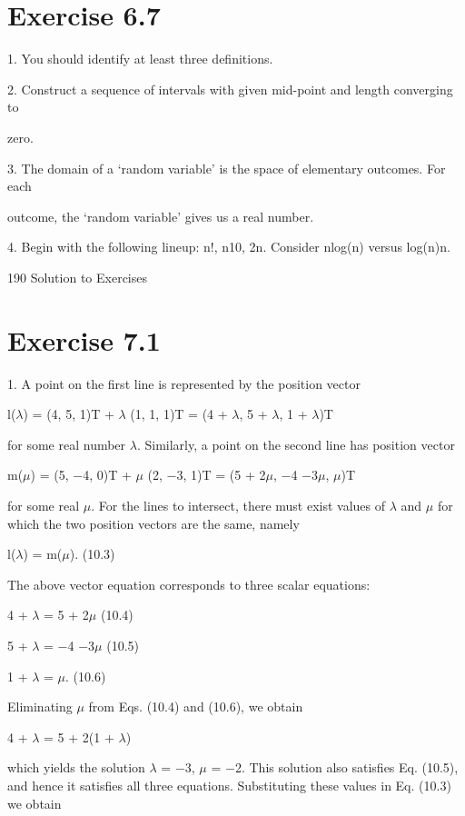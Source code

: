 \documentclass[11pt]{article}
\theoremstyle{plain}
\theoremstyle{definition}
\begin{document}
\section{Exercise 6.7}

1. You should identify at least three definitions.

2. Construct a sequence of intervals with given mid-point and length converging to

zero.

3. The domain of a `random variable' is the space of elementary outcomes. For each

outcome, the `random variable' gives us a real number.

4. Begin with the following lineup: n!, n10, 2n. Consider nlog(n) versus log(n)n.

190 Solution to Exercises

\section{Exercise 7.1}

1. A point on the first line is represented by the position vector

l($\lambda$) = (4, 5, 1)T + $\lambda$ (1, 1, 1)T = (4 + $\lambda$, 5 + $\lambda$, 1 + $\lambda$)T

for some real number $\lambda$. Similarly, a point on the second line has position vector

m($\mu$) = (5, $-$4, 0)T + $\mu$ (2, $-$3, 1)T = (5 + 2$\mu$, $-$4 $-$3$\mu$, $\mu$)T

for some real $\mu$. For the lines to intersect, there must exist values of $\lambda$ and $\mu$ for which the two position vectors are the same, namely

l($\lambda$) = m($\mu$). (10.3)

The above vector equation corresponds to three scalar equations:

4 + $\lambda$ = 5 + 2$\mu$ (10.4)

5 + $\lambda$ = $-$4 $-$3$\mu$ (10.5)

1 + $\lambda$ = $\mu$. (10.6)

Eliminating $\mu$ from Eqs. (10.4) and (10.6), we obtain

4 + $\lambda$ = 5 + 2(1 + $\lambda$)

which yields the solution $\lambda$ = $-$3, $\mu$ = $-$2. This solution also satisfies Eq. (10.5), and hence it satisfies all three equations. Substituting these values in Eq. (10.3) we obtain
\end{document}
